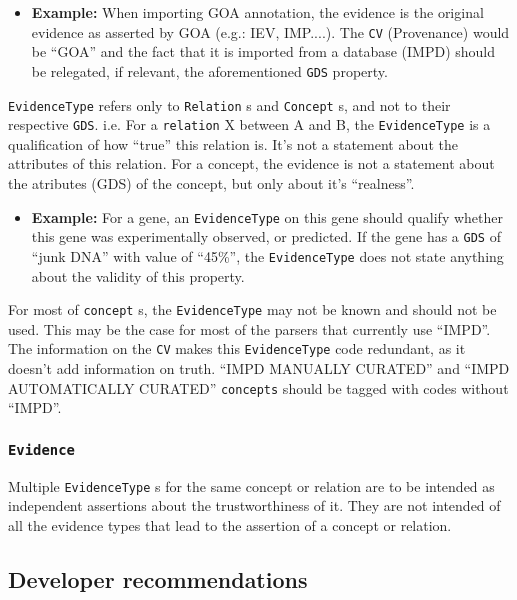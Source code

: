 \documentclass[a4paper,10pt]{article}
\newcommand{\example}[1]{\item\textbf{Example: }#1\xspace}
\newcommand{\term}[1]{\texttt{#1}\xspace}
\begin{document}
\begin{itemize}
\example{When importing GOA annotation, the evidence is the original evidence as asserted by GOA (e.g.: IEV, IMP....). The \term{CV} (Provenance) would be ``GOA'' and the fact that it is imported from a database (IMPD) should be relegated, if relevant, the aforementioned \term{GDS} property.}
\end{itemize}
\noindent
\term{EvidenceType} refers only to \term{Relation}s and \term{Concept}s, and not to their respective \term{GDS}. i.e. For a \term{relation} X between A and B, the \term{EvidenceType} is a qualification of how ``true'' this relation is. It's not a statement about the attributes of this relation. For a concept, the evidence is not a statement about the atributes (GDS) of the concept, but only about it's ``realness''.

\begin{itemize}
\example{For a gene, an \term{EvidenceType} on this gene should qualify whether this gene was experimentally observed, or predicted. If the gene has a \term{GDS} of ``junk DNA'' with value of ``45\%'', the \term{EvidenceType} does not state anything about the validity of this property.}
\end{itemize}
\noindent
For most of \term{concept}s, the \term{EvidenceType} may not be known and should not be used. This may be the case for most of the parsers that currently use ``IMPD''. The information on the \term{CV} makes this \term{EvidenceType} code redundant, as it doesn't add information on truth. ``IMPD MANUALLY CURATED'' and ``IMPD AUTOMATICALLY CURATED'' \term{concepts} should be tagged with codes without ``IMPD''.


\subsubsection{\term{Evidence}}

Multiple \term{EvidenceType}s for the same concept or relation are to be intended as independent assertions about the trustworthiness of it. They are not intended of all the evidence types that lead to the assertion of a concept or relation. 


\subsection{Developer recommendations}
\end{document}
